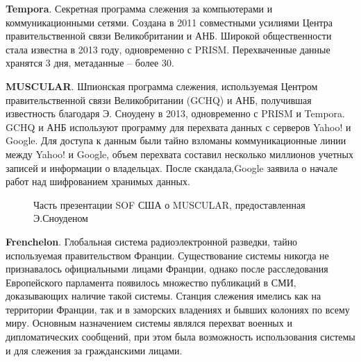 	\textbf{Tempora}. Секретная программа слежения за компьютерами и коммуникационными сетями. Создана в 2011 совместными усилиями  Центра правительственной связи Великобритании и АНБ.	Широкой общественности стала известна в 2013 году, одновременно с PRISM. Перехваченные данные хранятся 3 дня, метаданные -- более 30. \cite{Tempora} %
	
	
	\textbf{MUSCULAR}.    Шпионская  программа слежения, используемая Центром правительственной связи Великобритании (GCHQ) и АНБ, получившая известность благодаря Э. Сноудену в 2013, одновременно с PRISM и Tempora. GCHQ и АНБ используют программу для перехвата данных с серверов Yahoo! и Google. Для доступа к данным были тайно взломаны коммуникационные линии между Yahoo! и Google, объем перехвата составил  несколько миллионов учетных записей и информации о владельцах.  После скандала,Google заявила о начале работ над шифрованием хранимых данных. \cite{MUSCULAR} 	%
	\begin{figure*}[h!]
		\caption{ Часть презентации SOF США о MUSCULAR, предоставленная Э.Сноуденом}
	\end{figure*} 
	
	\textbf{Frenchelon}. Глобальная система радиоэлектронной разведки, тайно используемая правительством Франции. Существование системы никогда не признавалось официальными лицами Франции, однако после расследования Европейского парламента появилось множество публикаций в СМИ, доказывающих наличие такой системы. %
	Станция слежения имелись как на территории Франции, так и в заморских владениях и бывших колониях по всему миру. Основным назначением системы являлся перехват военных и дипломатических сообщений, при этом была возможность использования системы и для слежения за гражданскими лицами. 
	
